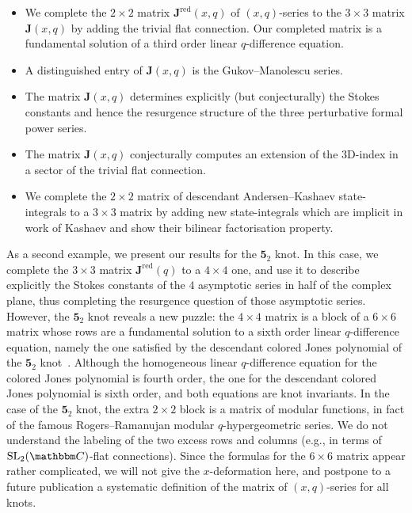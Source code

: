 \documentclass[12pt,reqno]{amsart}
\theoremstyle{definition}
\def\BC{\mathbbm C}
\def\SL{\mathrm{SL}}
\def\bJ{\mathbf J}
\def\RED{\mathrm{red}}
\def\md{\mathbf}
\newcommand{\knot}[1]{\md{#1}}
\begin{document}
\begin{itemize}
\item We complete the $2 \times 2$ matrix $\bJ^\RED(x,q)$ of
  $(x,q)$-series to the $3 \times 3$ matrix $\bJ(x,q)$ by adding the
  trivial flat connection. Our completed matrix is a fundamental
  solution of a third order linear $q$-difference equation.
\item A distinguished entry of $\bJ(x,q)$ is the Gukov--Manolescu
  series.
\item The matrix $\bJ(x,q)$ determines explicitly (but conjecturally)
  the Stokes constants and hence the resurgence structure of the three
  perturbative formal power series.
\item The matrix $\bJ(x,q)$ conjecturally computes an extension of the
  3D-index in a sector of the trivial flat connection.
\item We complete the $2 \times 2$ matrix of descendant
  Andersen--Kashaev state-integrals to a $3 \times 3$ matrix by adding
  new state-integrals which are implicit in work of Kashaev and show
  their bilinear factorisation property.
\end{itemize}


As a second example, we present our results for the $\knot{5}_2$ knot. In this case,
we complete the $3 \times 3$ matrix $\bJ^\RED(q)$ to a $4 \times 4$ one, and use it
to describe explicitly the Stokes constants of the $4$ asymptotic series in
half of the complex plane, thus completing the resurgence question of those
asymptotic series. However, the $\knot{5}_2$ knot reveals a new puzzle: the $4 \times 4$
matrix is a block of a $6 \times 6$ matrix whose rows are a fundamental solution
to a sixth order linear $q$-difference equation, namely the one satisfied by the
descendant colored Jones polynomial of the $\knot{5}_2$ knot~\cite[Eqn.14]{GK:desc}.
Although the homogeneous linear $q$-difference equation for the colored Jones polynomial
is fourth order, the one for the descendant colored Jones polynomial is sixth order,
and both equations are knot invariants. In the case of the $\knot{5}_2$ knot, the
extra $2 \times 2$ block is a matrix of modular functions, in fact of the famous
Rogers--Ramanujan modular $q$-hypergeometric series. We do not understand the
labeling of the two excess rows and columns (e.g., in terms of $\SL_2(\BC)$-flat
connections). Since the formulas for the $6 \times 6$ matrix appear rather complicated,
we will not give the $x$-deformation here, and postpone to a future publication
a systematic definition of the matrix of $(x,q)$-series for all knots.
\end{document}
